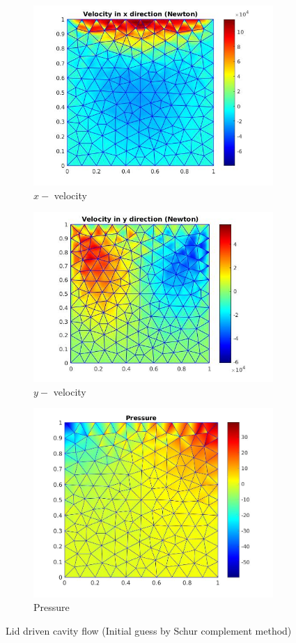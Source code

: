 \documentclass[a4paper,twoside,openright]{book}
\begin{document}
\begin{figure}
  \begin{subfigure}{\textwidth}
    \includegraphics[width=0.8\linewidth]{lid_newton_vx_schur.jpg}
    \caption{$x-$ velocity}
  \label{x_vel_navier_stoke_schur_lid}
  \end{subfigure}
  \begin{subfigure}{\textwidth}
    \includegraphics[width=0.8\linewidth]{lid_newton_vy_schur.jpg}
    \caption{$y-$ velocity}
  \label{y_vel_navier_stoke_schur_lid}
  \end{subfigure}
  \begin{subfigure}{\textwidth}
    \includegraphics[width=0.8\linewidth]{lid_newton_pressure_schur.jpg}
    \caption{Pressure}
  \label{pressure_navier_stoke_schur_lid}
  \end{subfigure}
\caption{Lid driven cavity flow (Initial guess by Schur complement method)}
\label{lid_driven_cavity_n_s_schur}
\end{figure}
\end{document}
